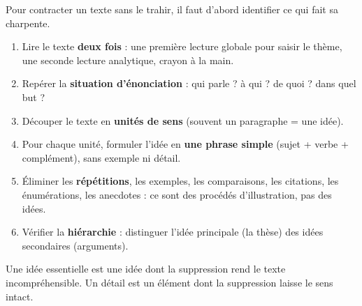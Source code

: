 \documentclass[11pt]{article}
\begin{document}
\begin{methode}
Pour contracter un texte sans le trahir, il faut d'abord identifier ce qui fait sa charpente.
\begin{enumerate}
\item Lire le texte \textbf{deux fois} : une première lecture globale pour saisir le thème, une seconde lecture analytique, crayon à la main.
\item Repérer la \textbf{situation d'énonciation} : qui parle ? à qui ? de quoi ? dans quel but ?
\item Découper le texte en \textbf{unités de sens} (souvent un paragraphe = une idée).
\item Pour chaque unité, formuler l'idée en \textbf{une phrase simple} (sujet + verbe + complément), sans exemple ni détail.
\item Éliminer les \textbf{répétitions}, les exemples, les comparaisons, les citations, les énumérations, les anecdotes : ce sont des procédés d'illustration, pas des idées.
\item Vérifier la \textbf{hiérarchie} : distinguer l'idée principale (la thèse) des idées secondaires (arguments).
\end{enumerate}
\begin{aretenir}
Une idée essentielle est une idée dont la suppression rend le texte incompréhensible. Un détail est un élément dont la suppression laisse le sens intact.
\end{aretenir}
\end{methode}
\end{document}

